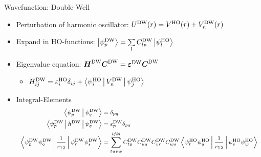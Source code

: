 \documentclass[10pt, t]{beamer}
\begin{document}
\begin{frame}[fragile]{Wavefunction: Double-Well}
    \begin{itemize}[<+->]
        \item Perturbation of harmonic oscillator: $\UDW(r) = \VHO(r) + \VDW_n(r)$
        \item Expand in HO-functions: $\ket{\psiDW_p} = \sumll{l}C^{\text{DW}}_{lp}\ket{\psiHO_l}$
        \item Eigenvalue equation: $\blds{H}^{\text{DW}}\blds{C}^{\text{DW}} =
            \blds{\varepsilon^{\text{DW}}}\blds{C}^{\text{DW}}$
            \begin{itemize}[<3->]
                \item $H^{\text{DW}}_{ij} = \veps^{\text{HO}}_i\delta_{ij} +
                    \Braket{\psiHO_i|\VDW_n|\psiHO_j}$
            \end{itemize}
        \item Integral-Elements
        \begin{equation*}
            \footnotesize
            \begin{aligned}
                \Braket{\psiDW_p|\psiDW_q} &= \delta_{pq} \\
                \Braket{\psiDW_p|h^{\text{DW}}|\psiDW_q} &=
                \varepsilon^{\text{DW}}_p\delta_{pq} \\
                \Braket{\psiDW_p\psiDW_q|\frac{1}{r_{12}}|\psiDW_r\psiDW_s} &=
                \suml{tuvw}{ijkl} C^{\text{DW}}_{tp}C^{\text{DW}}_{uq}C^{\text{DW}}_{vr}C^{\text{DW}}_{ws}
                \Braket{\psiHO_t\psiHO_u|\frac{1}{r_{12}}|\psiHO_v\psiHO_w}
            \end{aligned}
        \end{equation*}
    \end{itemize}
\end{frame}
\end{document}
